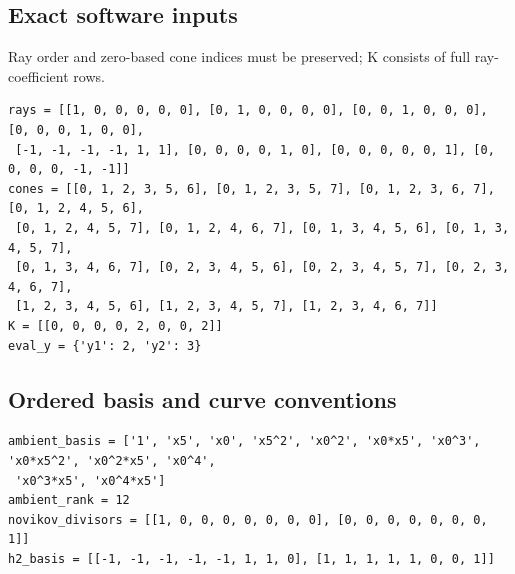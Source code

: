 \documentclass[10pt,a4paper]{article}
\begin{document}
\subsection*{Exact software inputs}
Ray order and zero-based cone indices must be preserved; K consists of full ray-coefficient rows.
\begin{lstlisting}
rays = [[1, 0, 0, 0, 0, 0], [0, 1, 0, 0, 0, 0], [0, 0, 1, 0, 0, 0], [0, 0, 0, 1, 0, 0],
 [-1, -1, -1, -1, 1, 1], [0, 0, 0, 0, 1, 0], [0, 0, 0, 0, 0, 1], [0, 0, 0, 0, -1, -1]]
cones = [[0, 1, 2, 3, 5, 6], [0, 1, 2, 3, 5, 7], [0, 1, 2, 3, 6, 7], [0, 1, 2, 4, 5, 6],
 [0, 1, 2, 4, 5, 7], [0, 1, 2, 4, 6, 7], [0, 1, 3, 4, 5, 6], [0, 1, 3, 4, 5, 7],
 [0, 1, 3, 4, 6, 7], [0, 2, 3, 4, 5, 6], [0, 2, 3, 4, 5, 7], [0, 2, 3, 4, 6, 7],
 [1, 2, 3, 4, 5, 6], [1, 2, 3, 4, 5, 7], [1, 2, 3, 4, 6, 7]]
K = [[0, 0, 0, 0, 2, 0, 0, 2]]
eval_y = {'y1': 2, 'y2': 3}
\end{lstlisting}
\subsection*{Ordered basis and curve conventions}
\begin{lstlisting}
ambient_basis = ['1', 'x5', 'x0', 'x5^2', 'x0^2', 'x0*x5', 'x0^3', 'x0*x5^2', 'x0^2*x5', 'x0^4',
 'x0^3*x5', 'x0^4*x5']
ambient_rank = 12
novikov_divisors = [[1, 0, 0, 0, 0, 0, 0, 0], [0, 0, 0, 0, 0, 0, 0, 1]]
h2_basis = [[-1, -1, -1, -1, -1, 1, 1, 0], [1, 1, 1, 1, 1, 0, 0, 1]]
\end{lstlisting}
\end{document}
